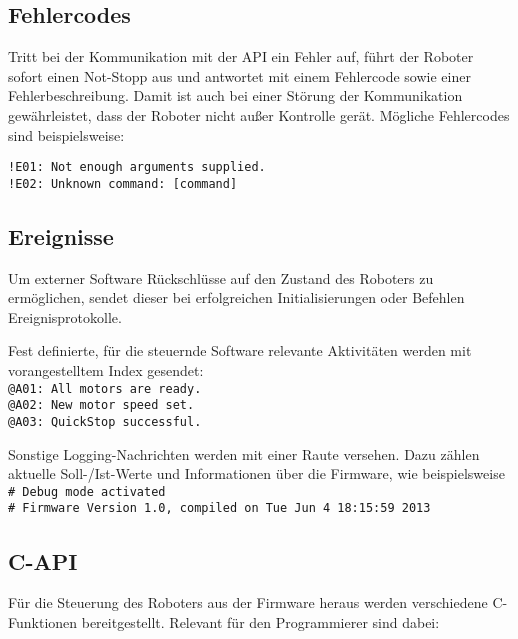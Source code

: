 \subsection{Fehlercodes}
Tritt bei der Kommunikation mit der API ein Fehler auf, führt der Roboter sofort einen Not-Stopp aus und antwortet mit einem Fehlercode sowie einer Fehlerbeschreibung.
Damit ist auch bei einer Störung der Kommunikation gewährleistet, dass der Roboter nicht außer Kontrolle gerät.
Mögliche Fehlercodes sind beispielsweise:

\lstinline{!E01: Not enough arguments supplied.}\\
\lstinline{!E02: Unknown command: [command]}\\


\subsection{Ereignisse}
Um externer Software Rückschlüsse auf den Zustand des Roboters zu ermöglichen, sendet dieser bei erfolgreichen Initialisierungen oder Befehlen Ereignisprotokolle.

Fest definierte, für die steuernde Software relevante Aktivitäten werden mit vorangestelltem Index gesendet:\\
\lstinline{@A01: All motors are ready.}\\
\lstinline{@A02: New motor speed set.}\\
\lstinline{@A03: QuickStop successful.}

Sonstige Logging-Nachrichten werden mit einer Raute versehen.
Dazu zählen aktuelle Soll-/Ist-Werte und Informationen über die Firmware, wie beispielsweise\\
\lstinline{# Debug mode activated}\\
\lstinline{# Firmware Version 1.0, compiled on Tue Jun 4 18:15:59 2013}


\subsection{C-API}
Für die Steuerung des Roboters aus der Firmware heraus werden verschiedene C-Funktionen bereitgestellt. Relevant für den Programmierer sind dabei:

